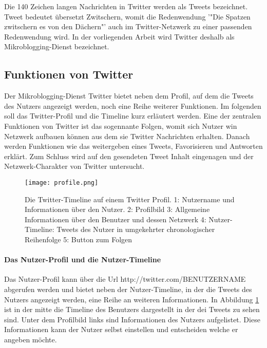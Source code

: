 		Die 140 Zeichen langen Nachrichten in Twitter werden als Tweets bezeichnet.
		Tweet bedeutet übersetzt Zwitschern, womit die Redenwendung '"Die Spatzen zwitschern es von den Dächern"' auch im Twitter-Netzwerk zu einer passenden Redenwendung  wird.  
		In der vorliegenden Arbeit wird Twitter deshalb als Mikroblogging-Dienst bezeichnet.
	

		\subsection{Funktionen von Twitter}
		Der Mikroblogging-Dienst Twitter bietet neben dem Profil, auf dem die Tweets des Nutzers angezeigt werden, noch eine Reihe weiterer Funktionen. 
		Im folgenden soll das Twitter-Profil und die Timeline kurz erläutert werden. 
		Eine der zentralen Funktionen von Twitter ist das sogennante Folgen, womit sich Nutzer win Netzwerk aufbauen können aus dem sie Twitter Nachrichten erhalten.
		Danach werden Funktionen wie das weitergeben eines Tweets, Favorisieren und Antworten erklärt. 
		Zum Schluss wird auf den gesendeten Tweet Inhalt eingenagen und der Netzwerk-Charakter von Twitter untersucht.

		\begin{figure}[h!]
		\begin{center}
		\texttt{[image: profile.png]}
		\caption{Die Twitter-Timeline auf einem Twitter Profil. 1: Nutzername und Informationen über den Nutzer. 2: Profilbild
		3: Allgemeine Informationen über den Benutzer und dessen Netzwerk
		4: Nutzer-Timeline: Tweets des Nutzer in umgekehrter chronologischer Reihenfolge 
		5: Button zum Folgen}
		\label{img:twitterProfile}
		\end{center}
		\end{figure}	


			\paragraph{Das Nutzer-Profil und die Nutzer-Timeline}
				Das Nutzer-Profil kann über die Url http://twitter.com/BENUTZERNAME abgerufen werden und bietet neben der Nutzer-Timeline, in der die Tweets des Nutzers angezeigt werden, eine Reihe an weiteren Informationen.
				In Abbildung \ref{img:twitterProfile} ist in der mitte die Timeline des Benutzers dargestellt in der dei Tweets zu sehen sind. 
				Unter dem Profilbild links sind Informationen des Nutzers aufgelistet.
				Diese Informationen kann der Nutzer selbst einstellen und entscheiden welche er angeben möchte.   


